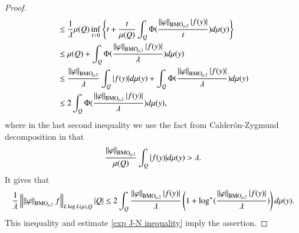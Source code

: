 \documentclass[leqno]{amsart}
\begin{document}
\begin{proof}
\begin{align*}
&\leq\frac{1}{\lambda}\mu(Q)\inf_{t>0}
\left\{ t+\frac{t}{\mu(Q)}\int_{Q}\Phi(\frac{\left\| \varphi \right\|_{{\rm BMO}_{\mu,2}}|f(y)|}{t})d\mu(y) \right\}\\
&\leq \mu(Q)+\int_{Q}\Phi(\frac{\left\| \varphi \right\|_{{\rm BMO}_{\mu,2}}|f(y)|}{\lambda})d\mu(y)\\
&\leq \frac{\left\| \varphi \right\|_{{\rm BMO}_{\mu,2}}}{\lambda}\int_{Q}|f(y)|d\mu(y)
+\int_{Q}\Phi(\frac{\left\| \varphi \right\|_{{\rm BMO}_{\mu,2}}|f(y)|}{\lambda})d\mu(y)\\
&\leq2\int_{Q}\Phi(\frac{\left\| \varphi \right\|_{{\rm BMO}_{\mu,2}}|f(y)|}{\lambda})d\mu(y),
\end{align*}
where in the last second inequality we use the fact from Calder\'{o}n-Zygmund decomposition in  that $$\frac{\left\| \varphi \right\|_{{\rm BMO}_{\mu,2}}}{\mu(Q)}\int_{Q}|f(y)|d\mu(y)>\lambda.$$
It gives that
\begin{align*}
\frac{1}{\lambda}\left\| \left\| \varphi \right\|_{{\rm BMO}_{\mu,2}}f \right\|_{L\log L(\mu),Q}|Q|
\leq2\int_{Q}\frac{\left\| \varphi \right\|_{{\rm BMO}_{\mu,2}}|f(y)|}{\lambda}\left(1+\log^{+}
(\frac{\left\| \varphi \right\|_{{\rm BMO}_{\mu,2}}|f(y)|}{\lambda})\right)d\mu(y).
\end{align*}
This inequality and estimate \eqref{exp J-N inequality} imply the assertion.

\end{proof}
\end{document}

